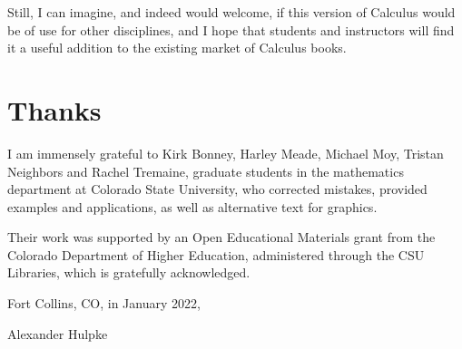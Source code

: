Still, I can imagine, and indeed would welcome, if this version of Calculus
would be of use for other disciplines, and I hope that students and
instructors will find it a useful addition to the existing market of
Calculus books.

\section*{Thanks}

I am immensely grateful to Kirk Bonney, Harley Meade, Michael Moy, Tristan Neighbors
and  Rachel Tremaine, graduate students in the mathematics department at
Colorado State University, who corrected mistakes,
provided examples and applications, as well as alternative text for graphics.

Their work was supported by an Open Educational Materials grant from the
Colorado Department of Higher Education, administered through the CSU
Libraries, which is gratefully acknowledged.

\bigskip

Fort Collins, CO, in January 2022,

Alexander Hulpke
